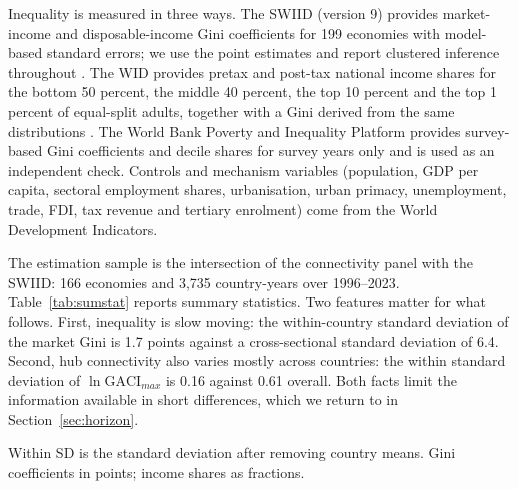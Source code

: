 \documentclass[12pt]{article}
\begin{document}
Inequality is measured in three ways. The SWIID (version 9) provides market-income and disposable-income Gini coefficients for 199 economies with model-based standard errors; we use the point estimates and report clustered inference throughout \citep{Solt_2020}. The WID provides pretax and post-tax national income shares for the bottom 50 percent, the middle 40 percent, the top 10 percent and the top 1 percent of equal-split adults, together with a Gini derived from the same distributions \citep{WID_2024}. The World Bank Poverty and Inequality Platform provides survey-based Gini coefficients and decile shares for survey years only and is used as an independent check. Controls and mechanism variables (population, GDP per capita, sectoral employment shares, urbanisation, urban primacy, unemployment, trade, FDI, tax revenue and tertiary enrolment) come from the World Development Indicators.

The estimation sample is the intersection of the connectivity panel with the SWIID: 166 economies and 3,735 country-years over 1996--2023. Table~\ref{tab:sumstat} reports summary statistics. Two features matter for what follows. First, inequality is slow moving: the within-country standard deviation of the market Gini is 1.7 points against a cross-sectional standard deviation of 6.4. Second, hub connectivity also varies mostly across countries: the within standard deviation of $\ln\mathrm{GACI}_{max}$ is 0.16 against 0.61 overall. Both facts limit the information available in short differences, which we return to in Section~\ref{sec:horizon}.

\begin{table}[H]\centering\caption{Summary statistics, estimation sample (166 economies, 1996--2023).}\label{tab:sumstat}
\begin{threeparttable}\small
\begin{tablenotes}\footnotesize\item Within SD is the standard deviation after removing country means. Gini coefficients in points; income shares as fractions.\end{tablenotes}\end{threeparttable}\end{table}
\end{document}
